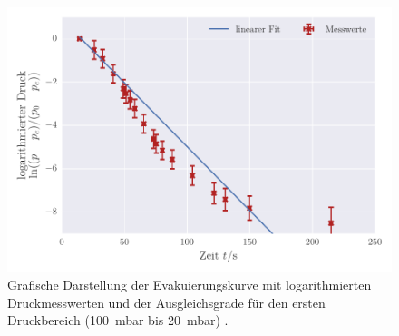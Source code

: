 \begin{figure}[!h]
 \centering
 \includegraphics[scale=.90]{../Grafiken/Evakuierungskurve_Drehschieber_log_0.pdf}
 \caption{Grafische Darstellung der Evakuierungskurve mit logarithmierten Druckmesswerten und der Ausgleichsgrade für den ersten Druckbereich (\SI{100}{\milli\bar} bis \SI{20}{\milli\bar}) .\label{fig:evakuierungskurve_drehschieber_log_0}}
 \end{figure} 